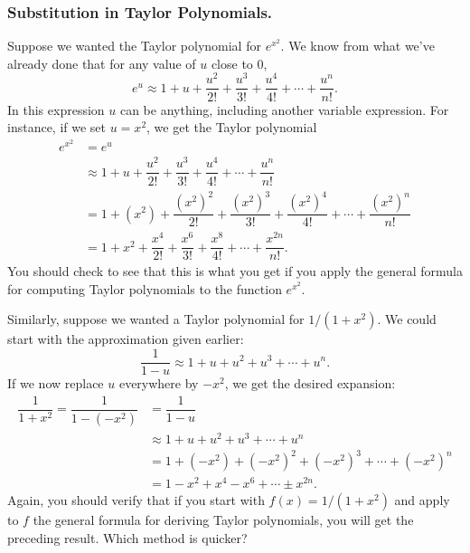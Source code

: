 \subsubsection{Substitution in Taylor Polynomials.}
Suppose we wanted the
Taylor polynomial for $e^{x^2}$.  We know from what we've already done
that for any value of $u$ close to 0,
\[
e^u \approx 1 + u + \dfrac{u^2}{2!} + \dfrac{u^3}{3!} 
                + \dfrac{u^4}{4!} + \cdots + \dfrac{u^n}{n!}.
\]
In this expression $u$ can be anything, including another variable
expression.  For instance, if we set $u=x^2$, we get the Taylor
polynomial
\begin{align*}
e^{x^2} &= e^u \\[-3pt]
        &\approx  1 + u + \dfrac{u^2}{2!} + \dfrac{u^3}{3!} 
                + \dfrac{u^4}{4!} + \cdots + \dfrac{u^n}{n!} \\[3pt]
        &= 1 + (x^2) + \dfrac{(x^2)^2}{2!} + \dfrac{(x^2)^3}{3!} 
          + \dfrac{(x^2)^4}{4!} + \cdots + \dfrac{(x^2)^n}{n!} \\[3pt]
        &= 1 + x^2 + \dfrac{x^4}{2!} + \dfrac{x^6}{3!} + \dfrac{x^8}{4!} 
             + \cdots + \dfrac{x^{2n}}{n!}.
\end{align*}
You should check to see that this is what you get if you apply the
general formula for computing Taylor polynomials to the function
$e^{x^2}$.


\pagebreak

Similarly, suppose we wanted a Taylor polynomial for $1/(1+x^2)$.  We
could start with the approximation given earlier:
\[
\dfrac{1}{1-u} \approx 1+u+u^2+u^3+\cdots +u^n.
\]
If we now replace $u$ everywhere by $-x^2$, we get the desired expansion:
\begin{align*}
\dfrac {1}{1+x^2} =  \dfrac{1}{1-(-x^2)}
        &=  \dfrac{1}{1-u}  \\
        &\approx  1+u+u^2+u^3+\cdots +u^n \\[3pt]
        &=  1+(-x^2)+(-x^2)^2+(-x^2)^3+\cdots +(-x^2)^n \\[3pt]
        &=  1-x^2+x^4-x^6+\cdots \pm x^{2n}.
\end{align*}
Again, you should verify that if you start with $f(x)=1/(1+x^2)$ and
apply to $f$ the general formula for deriving Taylor polynomials, you
will get the preceding result.  Which method is quicker?




